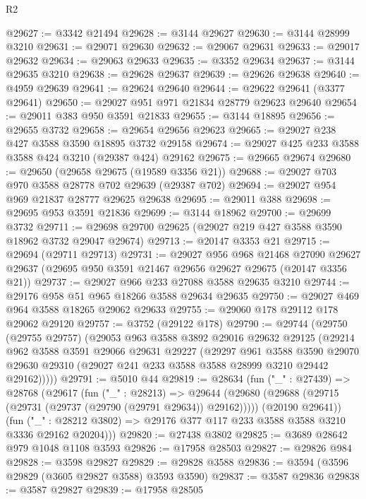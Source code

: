 \begin{lexlean}{R2}
\begin{coremodule}
@29627 := @3342 @21494
@29628 := @3144 @29627
@29630 := @3144 @28999 @3210
@29631 := @29071 @29630
@29632 := @29067 @29631
@29633 := @29017 @29632
@29634 := @29063 @29633
@29635 := @3352 @29634
@29637 := @3144 @29635 @3210
@29638 := @29628 @29637
@29639 := @29626 @29638
@29640 := @4959 @29639
@29641 := @29624 @29640
@29644 := @29622 @29641 (@3377 @29641)
@29650 := @29027 @951 @971 @21834 @28779 @29623 @29640
@29654 := @29011 @383 @950 @3591 @21833
@29655 := @3144 @18895
@29656 := @29655 @3732
@29658 := @29654 @29656 @29623
@29665 := @29027 @238 @427 @3588 @3590 @18895 @3732 @29158
@29674 := @29027 @425 @233 @3588 @3588 @424 @3210 (@29387 @424) @29162
@29675 := @29665 @29674
@29680 := @29650 (@29658 @29675 (@19589 @3356 @21))
@29688 := @29027 @703 @970 @3588 @28778 @702 @29639 (@29387 @702)
@29694 := @29027 @954 @969 @21837 @28777 @29625 @29638
@29695 := @29011 @388
@29698 := @29695 @953 @3591 @21836
@29699 := @3144 @18962
@29700 := @29699 @3732
@29711 := @29698 @29700 @29625 (@29027 @219 @427 @3588 @3590 @18962 @3732 @29047 @29674)
@29713 := @20147 @3353 @21
@29715 := @29694 (@29711 @29713)
@29731 := @29027
    @956
    @968
    @21468
    @27090
    @29627
    @29637
    (@29695 @950 @3591 @21467 @29656 @29627 @29675 (@20147 @3356 @21))
@29737 := @29027 @966 @233 @27088 @3588 @29635 @3210
@29744 := @29176 @958 @51 @965 @18266 @3588 @29634 @29635
@29750 := @29027 @469 @964 @3588 @18265 @29062 @29633
@29755 := @29060 @178 @29112 @178 @29062 @29120
@29757 := @3752 (@29122 @178)
@29790 := @29744
    (@29750
      (@29755 @29757)
      (@29053
        @963
        @3588
        @3892
        @29016
        @29632
        @29125
        (@29214
          @962
          @3588
          @3591
          @29066
          @29631
          @29227
          (@29297
            @961
            @3588
            @3590
            @29070
            @29630
            @29310
            (@29027 @241 @233 @3588 @3588 @28999 @3210 @29442 @29162)))))
@29791 := @5010 @44
@29819 := @28634
    (fun ("_" : @27439) =>
    @28768
      (@29617
        (fun ("_" : @28213) =>
        @29644
          (@29680 (@29688 (@29715 (@29731 (@29737 (@29790 (@29791 @29634)) @29162)))))
          (@20190 @29641))
        (fun ("_" : @28212 @3802) => @29176 @377 @117 @233 @3588 @3588 @3210 @3336 @29162 @20204)))
@29820 := @27438 @3802
@29825 := @3689 @28642 @979 @1048 @1108 @3593
@29826 := @17958 @28503
@29827 := @29826 @984
@29828 := @3598 @29827
@29829 := @29828 @3588
@29836 := @3594 (@3596 @29829 (@3605 @29827 @3588) @3593 @3590)
@29837 := @3587 @29836
@29838 := @3587 @29827
@29839 := @17958 @28505

\end{coremodule}
\end{lexlean}
